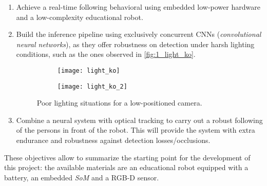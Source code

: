 	\begin{enumerate}
		\item Achieve a real-time following behavioral using embedded low-power hardware and a low-complexity educational robot.
		
		\item Build the inference pipeline using exclusively concurrent CNNs (\textit{convolutional neural networks}), as they offer robustness on detection under harsh lighting conditions, such as the ones observed in \autoref{fig:1_light_ko}.
		
			\begin{figure}[h]
			\centering
			\begin{subfigure}[b]{0.4\linewidth}
				\centering
				\texttt{[image: light\_ko]}
			\end{subfigure}
			\hfill
			\begin{subfigure}[b]{0.5\linewidth}
				\centering
				\texttt{[image: light\_ko\_2]}
			\end{subfigure}		
			
			\caption{Poor lighting situations for a low-positioned camera.}
			\label{fig:1_light_ko}
		\end{figure}
		
		
		\item Combine a neural system with optical tracking to carry out a robust following of the persons in front of the robot. This will provide the system with extra endurance and robustness against detection losses/occlusions.
	\end{enumerate}
	
These objectives allow to summarize the starting point for the development of this project: the available materials are an educational robot equipped with a battery, an embedded \textit{SoM} and a RGB-D sensor.


